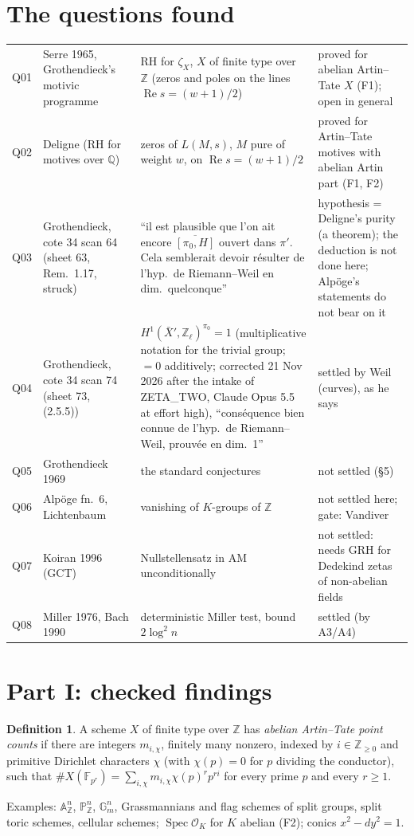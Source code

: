 \documentclass[11pt]{article}
\theoremstyle{definition}\newtheorem{definition}[theorem]{Definition}\newtheorem{remark}[theorem]{Remark}
\begin{document}
\section{The questions found}
\begin{tabular}{p{1cm}p{3.2cm}p{6cm}p{4.5cm}}
Q01 & Serre 1965, Grothendieck's motivic programme & RH for $\zeta_X$, $X$ of finite type over $\mathbb Z$ (zeros and poles on the lines $\operatorname{Re}s=(w+1)/2$) & proved for abelian Artin--Tate $X$ (F1); open in general\\
Q02 & Deligne (RH for motives over $\mathbb Q$) & zeros of $L(M,s)$, $M$ pure of weight $w$, on $\operatorname{Re}s=(w+1)/2$ & proved for Artin--Tate motives with abelian Artin part (F1, F2)\\
Q03 & Grothendieck, cote 34 scan 64 (sheet 63, Rem.~1.17, struck) & ``il est plausible que l'on ait encore $\overline{[\pi_0,H]}$ ouvert dans $\pi'$. Cela semblerait devoir r\'esulter de l'hyp.\ de Riemann--Weil en dim.\ quelconque'' & hypothesis = Deligne's purity (a theorem); the deduction is not done here; Alp\"oge's statements do not bear on it\\
Q04 & Grothendieck, cote 34 scan 74 (sheet 73, (2.5.5)) & $H^1(\bar X',\mathbb Z_\ell)^{\pi_0}=1$ (multiplicative notation for the trivial group; $=0$ additively; corrected 21 Nov 2026 after the intake of ZETA\_TWO, Claude Opus 5.5 at effort high), ``cons\'equence bien connue de l'hyp.\ de Riemann--Weil, prouv\'ee en dim.\ 1'' & settled by Weil (curves), as he says\\
Q05 & Grothendieck 1969 & the standard conjectures & not settled (\S5)\\
Q06 & Alp\"oge fn.~6, Lichtenbaum & vanishing of $K$-groups of $\mathbb Z$ & not settled here; gate: Vandiver\\
Q07 & Koiran 1996 (GCT) & Nullstellensatz in AM unconditionally & not settled: needs GRH for Dedekind zetas of non-abelian fields\\
Q08 & Miller 1976, Bach 1990 & deterministic Miller test, bound $2\log^2n$ & settled (by A3/A4)\\
\end{tabular}

\section{Part I: checked findings}
\begin{definition}A scheme $X$ of finite type over $\mathbb Z$ has \emph{abelian Artin--Tate point counts} if there are
integers $m_{i,\chi}$, finitely many nonzero, indexed by $i\in\mathbb Z_{\ge0}$ and primitive Dirichlet characters
$\chi$ (with $\chi(p)=0$ for $p$ dividing the conductor), such that $\#X(\mathbb F_{p^r})=\sum_{i,\chi}m_{i,\chi}\chi(p)^rp^{ri}$
for every prime $p$ and every $r\ge1$.\end{definition}
Examples: $\mathbb A^n_{\mathbb Z}$, $\mathbb P^n_{\mathbb Z}$, $\mathbb G_m^n$, Grassmannians and flag schemes of split groups, split
toric schemes, cellular schemes; $\operatorname{Spec}\mathcal O_K$ for $K$ abelian (F2); conics $x^2-dy^2=1$.
\end{document}
